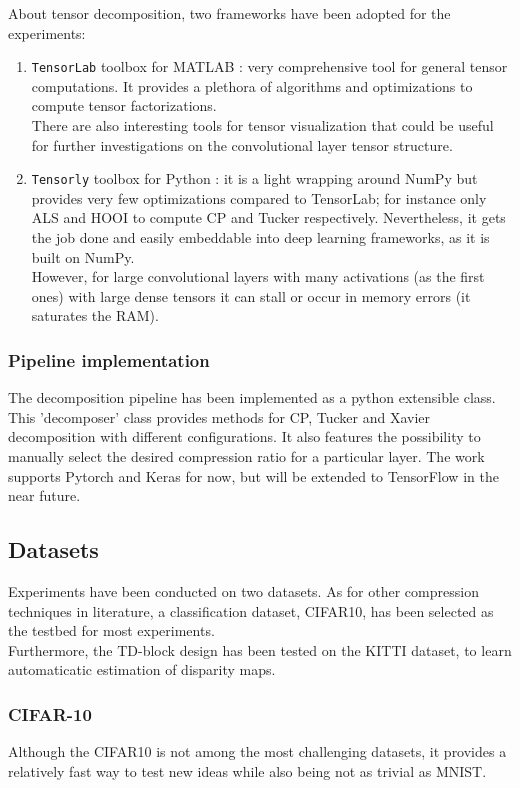 About tensor decomposition, two frameworks have been adopted for the experiments: 
\begin{enumerate}
    \item \texttt{TensorLab} toolbox for MATLAB \parencite{Wtensorlab}: very comprehensive tool for general tensor computations. It provides a plethora of algorithms and optimizations to compute tensor factorizations. \\ 
    There are also interesting tools for tensor visualization that could be useful for further investigations on the convolutional layer tensor structure. 
    
    \item \texttt{Tensorly} toolbox for Python \parencite{tensorly}: it is a light wrapping around NumPy but provides very few optimizations compared to TensorLab; for instance only ALS and HOOI to compute CP and Tucker respectively. Nevertheless, it gets the job done and easily embeddable into deep learning frameworks, as it is built on NumPy. \\
    However, for large convolutional layers with many activations (as the first ones) with large dense tensors it can stall or occur in memory errors (it saturates the RAM). 
\end{enumerate}

\subsubsection{Pipeline implementation}
The decomposition pipeline has been implemented as a python extensible class. This 'decomposer' class provides methods for CP, Tucker and Xavier decomposition with different configurations. It also features the possibility to manually select the desired compression ratio for a particular layer. The work supports Pytorch and Keras for now, but will be extended to TensorFlow in the near future.  

\subsection{Datasets}
Experiments have been conducted on two datasets. As for other compression techniques in literature, a classification dataset, CIFAR10, has been selected as the testbed for most experiments. \\
Furthermore, the TD-block design has been tested on the KITTI dataset, to learn automaticatic estimation of disparity maps. 


\subsubsection{CIFAR-10}
Although the CIFAR10 is not among the most challenging datasets, it provides a relatively fast way to test new ideas while also being not as trivial as MNIST. 


